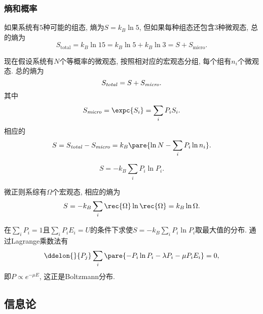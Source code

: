 \documentclass[../Thermal.tex]{subfiles}
\begin{document}
\subsubsection{熵和概率}
\begin{ex}
如果系统有$5$种可能的组态, 熵为$S = k_B\ln 5$, 但如果每种组态还包含$3$种微观态, 总的熵为
\[ S_{\mathrm{total}} = k_B\ln 15 = k_B \ln 5 + k_B \ln 3 = S + S_{\mathrm{micro}}. \]
\end{ex}
现在假设系统有$N$个等概率的微观态, 按照相对应的宏观态分组, 每个组有$n_i$个微观态. 总的熵为
\[ S_{\text{\textit{total}}} = S + S_{\text{\textit{micro}}}. \]
其中
\[ S_{\text{\textit{micro}}} = \expc{S_i} = \sum_i P_i S_i. \]
相应的
\[ S = S_{\text{\textit{total}}} - S_{\text{\textit{micro}}} = k_B\pare{\ln N - \sum_i P_i \ln n_i}. \]
\begin{finale}
\begin{corollary}[熵的Gibbs表示]
\[ S = -k_B \sum_i P_i \ln P_i. \]
\end{corollary}
\end{finale}
\begin{ex}
微正则系综有$\Omega$个宏观态, 相应的熵为
\[ S = -k_B \sum_i \rec{\Omega}\ln\rec{\Omega} = k_B \ln\Omega. \]
\end{ex}
\begin{ex}
在$\sum_i P_i = 1$且$\sum_i P_i E_i = U$的条件下求使$S = -k_B\sum_i P_i \ln P_i$取最大值的分布. 通过Lagrange乘数法有
\[ \ddelon{}{P_j} \sum_i\pare{-P_i\ln P_i - \lambda P_i - \mu P_i E_i} = 0, \]
即$P \propto e^{-\mu E}$, 这正是Boltzmann分布.
\end{ex}
\subsection{信息论}
\end{document}
